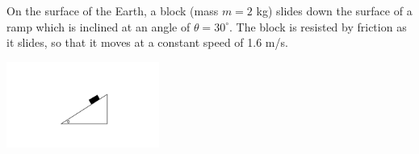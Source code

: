 \question On the surface of the Earth, a block (mass $m=2$ kg) slides down the surface of a ramp which is inclined at an angle of $\theta=30^\circ$. The block is resisted by friction as it slides, so that it moves at a constant speed of 1.6 m/s.
\begin{center}
	\includegraphics[width=5cm]{friction_ramp.pdf}
\end{center}

